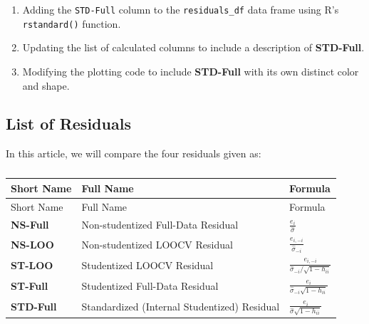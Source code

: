 \documentclass[
  letterpaper,
  DIV=11,
  numbers=noendperiod]{scrreprt}
\providecommand{\tightlist}{%
  \setlength{\itemsep}{0pt}\setlength{\parskip}{0pt}}\usepackage{longtable,booktabs,array}
\begin{document}
\begin{enumerate}
\def\labelenumi{\arabic{enumi}.}
\tightlist
\item
  Adding the \texttt{STD-Full} column to the \texttt{residuals\_df} data
  frame using R's \texttt{rstandard()} function.
\item
  Updating the list of calculated columns to include a description of
  \textbf{STD-Full}.
\item
  Modifying the plotting code to include \textbf{STD-Full} with its own
  distinct color and shape.
\end{enumerate}

\subsection{List of Residuals}\label{list-of-residuals}

In this article, we will compare the four residuals given as:

\begin{longtable}[]{@{}
  >{\raggedright\arraybackslash}p{}
  >{\raggedright\arraybackslash}p{}
  >{\raggedright\arraybackslash}p{}@{}}
\caption{}\label{tbl-residuals-five-plausible-residuals}\tabularnewline
\toprule\noalign{}
\begin{minipage}[b]{\linewidth}\raggedright
Short Name
\end{minipage} & \begin{minipage}[b]{\linewidth}\raggedright
Full Name
\end{minipage} & \begin{minipage}[b]{\linewidth}\raggedright
Formula
\end{minipage} \\
\midrule\noalign{}
\endfirsthead
\toprule\noalign{}
\begin{minipage}[b]{\linewidth}\raggedright
Short Name
\end{minipage} & \begin{minipage}[b]{\linewidth}\raggedright
Full Name
\end{minipage} & \begin{minipage}[b]{\linewidth}\raggedright
Formula
\end{minipage} \\
\midrule\noalign{}
\endhead
\bottomrule\noalign{}
\endlastfoot
\textbf{NS-Full} & Non-studentized Full-Data Residual &
\(\frac{e_i}{\hat{\sigma}}\) \\
\textbf{NS-LOO} & Non-studentized LOOCV Residual &
\(\frac{e_{i,-i}}{\hat{\sigma}_{-i}}\) \\
\textbf{ST-LOO} & Studentized LOOCV Residual &
\(\frac{e_{i,-i}}{\hat{\sigma}_{-i}/\sqrt{1-h_{ii}}}\) \\
\textbf{ST-Full} & Studentized Full-Data Residual &
\(\frac{e_i}{\hat{\sigma}_{-i}\sqrt{1-h_{ii}}}\) \\
\textbf{STD-Full} & Standardized (Internal Studentized) Residual &
\(\frac{e_i}{\hat{\sigma}\sqrt{1-h_{ii}}}\) \\
\end{longtable}
\end{document}
